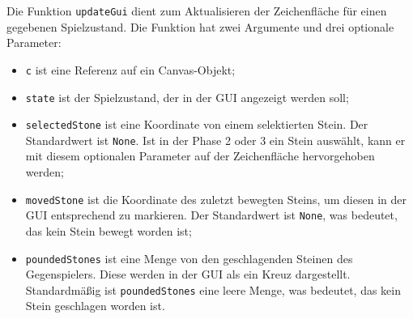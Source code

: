 \documentclass[11pt]{article}
\providecommand{\tightlist}{%
      \setlength{\itemsep}{0pt}\setlength{\parskip}{0pt}}
\begin{document}
    Die Funktion \texttt{updateGui} dient zum Aktualisieren der
Zeichenfläche für einen gegebenen Spielzustand. Die Funktion hat zwei
Argumente und drei optionale Parameter:

\begin{itemize}
\tightlist
\item
  \texttt{c} ist eine Referenz auf ein Canvas-Objekt;
\item
  \texttt{state} ist der Spielzustand, der in der GUI angezeigt werden
  soll;
\item
  \texttt{selectedStone} ist eine Koordinate von einem selektierten
  Stein. Der Standardwert ist \texttt{None}. Ist in der Phase 2 oder 3
  ein Stein auswählt, kann er mit diesem optionalen Parameter auf der
  Zeichenfläche hervorgehoben werden;
\item
  \texttt{movedStone} ist die Koordinate des zuletzt bewegten Steins, um
  diesen in der GUI entsprechend zu markieren. Der Standardwert ist
  \texttt{None}, was bedeutet, das kein Stein bewegt worden ist;
\item
  \texttt{poundedStones} ist eine Menge von den geschlagenden Steinen
  des Gegenspielers. Diese werden in der GUI als ein Kreuz dargestellt.
  Standardmäßig ist \texttt{poundedStones} eine leere Menge, was
  bedeutet, das kein Stein geschlagen worden ist.
\end{itemize}
\end{document}
